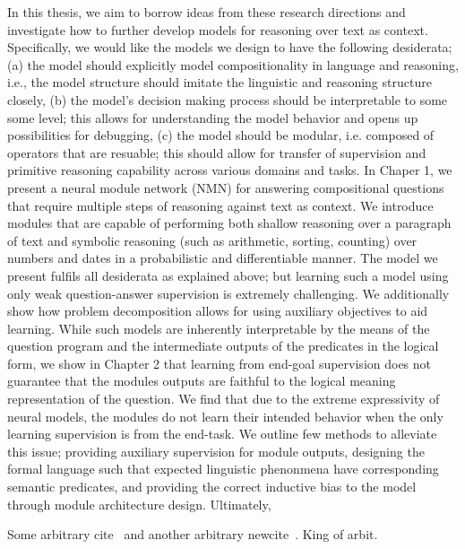 \documentclass[main.tex]{subfiles}
\begin{document}
In this thesis, we aim to borrow ideas from these research directions and investigate how to further develop models for reasoning over text as context.  Specifically, we would like the models we design to have the following desiderata; (a) the model should explicitly model compositionality in language and reasoning, i.e., the model structure should imitate the linguistic and reasoning structure closely, (b) the model's decision making process should be interpretable to some some level; this allows for understanding the model behavior and opens up possibilities for debugging, (c) the model should be modular, i.e. composed of operators that are resuable; this should allow for transfer of supervision and primitive reasoning capability across various domains and tasks.
In Chaper 1, we present a neural module network (NMN) for answering compositional questions that require multiple steps of reasoning against text as context.  We introduce modules that are capable of performing both shallow reasoning over a paragraph of text and symbolic reasoning (such as arithmetic, sorting, counting) over numbers and dates in a probabilistic and differentiable manner.  The model we present fulfils all desiderata as explained above; but learning such a model using only weak question-answer supervision is extremely challenging.  We additionally show how problem decomposition allows for using auxiliary objectives to aid learning.
While such models are inherently interpretable by the means of the question program and the intermediate outputs of the predicates in the logical form, we show in Chapter 2 that learning from end-goal supervision does not guarantee that the modules outputs are faithful to the logical meaning representation of the question.  We find that due to the extreme expressivity of neural models, the modules do not learn their intended behavior when the only learning supervision is from the end-task.  We outline few methods to alleviate this issue; providing auxiliary supervision for module outputs, designing the formal language such that expected linguistic phenonmena have corresponding semantic predicates, and providing the correct inductive bias to the model through module architecture design.
Ultimately,


Some arbitrary cite~\cite{grycner2015relly} and another arbitrary newcite~. King of arbit.


\end{document}
